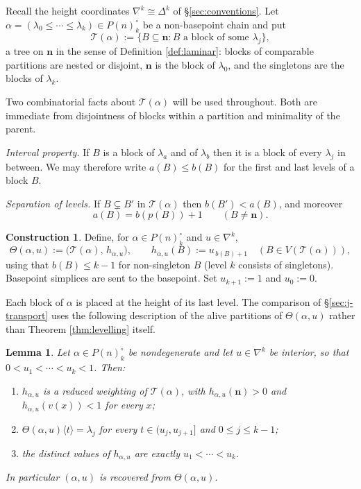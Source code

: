 \documentclass[12pt]{amsart}
\newtheorem{lemma}[subsection]{Lemma}
\theoremstyle{definition}
\newtheorem{construction}[subsection]{Construction}
\theoremstyle{remark}
\newcommand{\TreeF}{\mathcal{T}}                 %
\newcommand{\Thet}{\Theta}                       %
\newcommand{\alive}[2]{#1\langle #2\rangle}      %
\begin{document}
Recall the height coordinates $\nabla^k\cong \Delta^k$ of \S\ref{sec:conventions}. Let $\alpha = (\lambda_0\leq \cdots \leq \lambda_k)\in P(n)^{\circ}_k$ be a non-basepoint chain and put
\[\TreeF(\alpha) := \{ B \subseteq \mathbf{n} : B \text{ a block of some } \lambda_j \},\]
a tree on $\mathbf{n}$ in the sense of Definition \ref{def:laminar}: blocks of comparable partitions are nested or disjoint, $\mathbf{n}$ is the block of $\lambda_0$, and the singletons are the blocks of $\lambda_k$.

Two combinatorial facts about $\TreeF(\alpha)$ will be used throughout. Both are immediate from disjointness of blocks within a partition and minimality of the parent.

\emph{Interval property.} If $B$ is a block of $\lambda_a$ and of $\lambda_b$ then it is a block of every $\lambda_j$ in between. We may therefore write $a(B)\leq b(B)$ for the first and last levels of a block $B$.

\emph{Separation of levels.} If $B\subsetneq B'$ in $\TreeF(\alpha)$ then $b(B')<a(B)$, and moreover
\begin{equation}\label{eq:parent-level}
a(B) = b(p(B))+1 \quad\quad (B\neq\mathbf{n}).
\end{equation}

\begin{construction}\label{con:theta}
Define, for $\alpha\in P(n)^{\circ}_k$ and $u\in \nabla^k$,
\[ \Thet(\alpha, u) := \big(\TreeF(\alpha),\, h_{\alpha,u}\big), \quad\quad h_{\alpha, u}(B) := u_{\,b(B)+1} \quad (B\in V(\TreeF(\alpha))),\]
using that $b(B)\leq k-1$ for non-singleton $B$ (level $k$ consists of singletons). Basepoint simplices are sent to the basepoint. Set $u_{k+1}:=1$ and $u_0 := 0$.
\end{construction}

Each block of $\alpha$ is placed at the height of its last level. The comparison of \S\ref{sec:j-transport} uses the following description of the alive partitions of $\Thet(\alpha,u)$ rather than Theorem \ref{thm:levelling} itself.

\begin{lemma}\label{lem:theta-dictionary}
Let $\alpha\in P(n)^{\circ}_k$ be nondegenerate and let $u\in\nabla^k$ be interior, so that $0<u_1<\cdots<u_k<1$. Then:
\begin{enumerate}[label=(\arabic*)]
    \item $h_{\alpha,u}$ is a reduced weighting of $\TreeF(\alpha)$, with $h_{\alpha,u}(\mathbf{n})>0$ and $h_{\alpha,u}(v(x))<1$ for every $x$;
    \item $\alive{\Thet(\alpha,u)}{t} = \lambda_j$ for every $t\in(u_j, u_{j+1}]$ and $0\leq j\leq k-1$;
    \item the distinct values of $h_{\alpha,u}$ are exactly $u_1<\cdots<u_k$.
\end{enumerate}
In particular $(\alpha,u)$ is recovered from $\Thet(\alpha,u)$.
\end{lemma}
\end{document}
